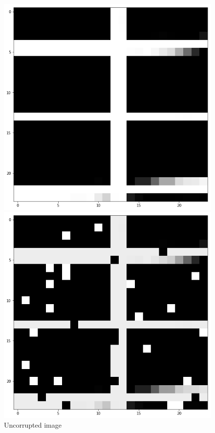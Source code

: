 \documentclass[10pt,conference,compsocconf]{IEEEtran}
\begin{document}
\begin{figure}[!htb]
  \includegraphics[width=\linewidth]{NoiseExamples_Uncorrupted.png}
  \caption{Uncorrupted image}\label{fig:nonoise}
\endminipage\hfill
{}
  \includegraphics[width=\linewidth]{NoiseExamples_SaltNPepper.png}

\end{figure}
\end{document}
